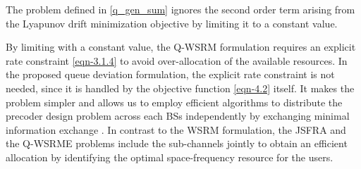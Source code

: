 The problem defined in \eqref{q_gen_sum} ignores the second order term arising from the Lyapunov drift minimization objective by limiting it to a constant value. 

By limiting  with a constant value, the \ac{Q-WSRM} formulation requires an explicit rate constraint \eqref{eqn-3.1.4} to avoid over-allocation of the available resources. In the proposed queue deviation formulation, the explicit rate constraint is not needed, since it is handled by the objective function \eqref{eqn-4.2} itself. It makes the problem simpler and allows us to employ efficient algorithms to distribute the precoder design problem across each \acp{BS} independently by exchanging minimal information exchange \cite{boyd2011distributed}. In contrast to the \ac{WSRM} formulation, the \ac{JSFRA} and the \ac{Q-WSRME} problems include the sub-channels jointly to obtain an efficient allocation by identifying the optimal space-frequency resource for the users.
